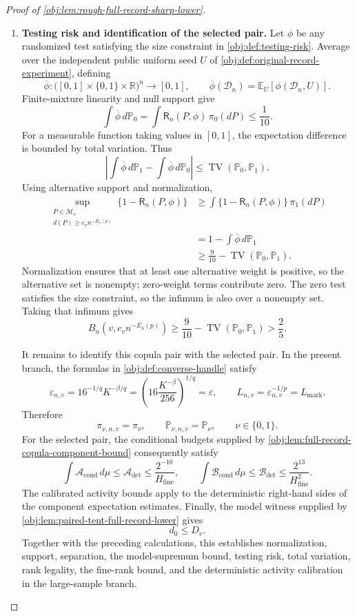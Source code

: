 \begin{proof}[Proof of \cref{obj:lem:rough-full-record-sharp-lower}]
\begin{enumerate}
\item \textbf{Testing risk and identification of the selected pair.}
Let \(\phi\) be any randomized test satisfying the size constraint in
\cref{obj:def:testing-risk}. Average over the independent public uniform seed \(U\) of
\cref{obj:def:original-record-experiment}, defining
\[
\overline\phi:
\bigl([0,1]\times\{0,1\}\times\mathbb R\bigr)^n
\longrightarrow[0,1],
\qquad
\overline\phi(\mathcal D_n)
=
\mathbb E_U[\phi(\mathcal D_n,U)].
\]
Finite-mixture linearity and null support give
\[
\int\overline\phi\,d\mathbb P_0
=
\int\mathsf R_n(P,\phi)\,\pi_0(dP)
\le\frac1{10}.
\]
For a measurable function taking values in \([0,1]\), the expectation difference is bounded by total variation. Thus
\[
\left|
\int\overline\phi\,d\mathbb P_1
-
\int\overline\phi\,d\mathbb P_0
\right|
\le\operatorname{TV}(\mathbb P_0,\mathbb P_1).
\]
Using alternative support and normalization,
\[
\begin{aligned}
\sup_{\substack{P\in\mathcal M_v\\
d(P)\ge c_vn^{-E_4(p)}}}
\{1-\mathsf R_n(P,\phi)\}
&\ge
\int\{1-\mathsf R_n(P,\phi)\}\,\pi_1(dP)\\
&=
1-\int\overline\phi\,d\mathbb P_1\\
&\ge
\frac9{10}-\operatorname{TV}(\mathbb P_0,\mathbb P_1).
\end{aligned}
\]
Normalization ensures that at least one alternative weight is positive, so the alternative set is nonempty; zero-weight terms contribute zero. The zero test satisfies the size constraint, so the infimum is also over a nonempty set. Taking that infimum gives
\[
B_n\!\left(v,c_vn^{-E_4(p)}\right)
\ge
\frac9{10}-\operatorname{TV}(\mathbb P_0,\mathbb P_1)
>\frac25.
\]

It remains to identify this copula pair with the selected pair. In the present branch, the formulas in
\cref{obj:def:converse-handle} satisfy
\[
\varepsilon_{n,v}
=
16^{-1/q}K^{-\beta/q}
=
\left(16\frac{K^{-\beta}}{256}\right)^{1/q}
=\varepsilon,
\qquad
L_{n,v}=\varepsilon_{n,v}^{-1/p}=L_{\mathrm{mark}}.
\]
Therefore
\[
\pi_{\nu,n,v}=\pi_\nu,
\qquad
\mathbb P_{\nu,n,v}=\mathbb P_\nu,
\qquad \nu\in\{0,1\}.
\]
For the selected pair, the conditional budgets supplied by
\cref{obj:lem:full-record-copula-component-bound} consequently satisfy
\[
\int\mathcal A_{\mathrm{cond}}\,d\mu
\le\mathcal A_{\mathrm{det}}
\le\frac{2^{-10}}{H_{\mathrm{fine}}},
\qquad
\int\mathcal B_{\mathrm{cond}}\,d\mu
\le\mathcal B_{\mathrm{det}}
\le\frac{2^{13}}{H_{\mathrm{fine}}^2}.
\]
The calibrated activity bounds apply to the deterministic right-hand sides of the component expectation estimates.
Finally, the model witness supplied by
\cref{obj:lem:paired-tent-full-record-lower} gives
\[
d_0\le D_v.
\]
Together with the preceding calculations, this establishes normalization, support, separation, the model-supremum bound, testing risk, total variation, rank legality, the fine-rank bound, and the deterministic activity calibration in the large-sample branch.


\end{enumerate}
\end{proof}
